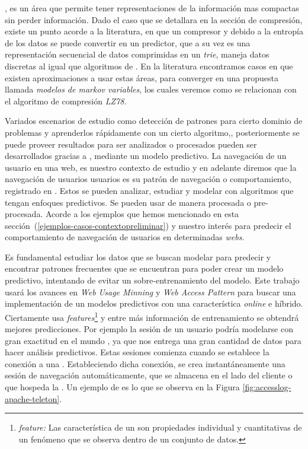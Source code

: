 %
%
%
%
\losslessdatacompression, es un área que permite tener representaciones de la información mas compactas sin perder información. Dado el caso que se detallara en la sección de compresión, existe un punto acorde a la literatura, en que un compresor y debido a la entropía de los datos se puede convertir en un predictor, que a su vez es una representación secuencial de datos comprimidas en un \emph{trie}, maneja datos discretas al igual que algoritmos de \machinelearning. En la literatura encontramos casos en que existen aproximaciones a usar estas áreas, para converger en una propuesta llamada \emph{modelos de markov variables}, los cuales veremos como se relacionan con el algoritmo de compresión \emph{LZ78}.

%
%

Variados escenarios de estudio como  detección de  patrones para cierto dominio de problemas y aprenderlos rápidamente con un cierto algoritmo,, posteriormente se puede proveer resultados para ser analizados o procesados pueden ser desarrollados gracias a \machinelearning, mediante un modelo predictivo.  La navegación de un usuario  en una web, es nuestro contexto de estudio y en adelante diremos que la  navegación de usuarios usuarios es su patrón de navegación o comportamiento, registrado en  \webasccesslog. Estos se pueden analizar, estudiar y modelar con algoritmos que tengan enfoques predictivos. Se pueden usar de manera procesada o pre-procesada. Acorde a los ejemplos que hemos mencionado en esta sección~(\ref{ejemplos-casos-contextopreliminar})  y nuestro interés para predecir el comportamiento de navegación de usuarios en determinadas \emph{webs}.



 Es fundamental estudiar los datos que se buscan modelar para predecir y encontrar patrones frecuentes que  se encuentran para poder crear un modelo predictivo, intentando de evitar un sobre-entrenamiento del modelo. Este trabajo usará los avances en \emph{Web Usage Minning} y \emph{Web Access Pattern} para buscar una implementación de un modelos predictivos con una característica \emph{online} e híbrido. Ciertamente \machinelearning usa \emph{features}\footnote{\emph{feature:} Las característica de un \machinelearning son propiedades individual y cuantitativas de un fenómeno que se observa dentro de un conjunto de datos.} y entre más información de entrenamiento se obtendrá  mejores predicciones. Por ejemplo la sesión de un usuario podría modelarse con gran exactitud en el mundo \machinelearning, ya que nos entrega una gran cantidad de datos para hacer análisis predictivos. Estas sesiones comienza cuando se establece la conexión a una \www. Estableciendo dicha conexión, se crea instantáneamente una sesión de navegación automáticamente, que se almacena en el lado del cliente o que hospeda la \www. Un ejemplo de  \webasccesslog es lo que se observa en la Figura \ref{fig:accesslog-apache-teleton}.

